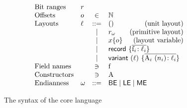 \begin{figure}
\[
\begin{array}{llclr}
  \text{Bit ranges} & r\\
  \text{Offsets}    & o & \in & \mathbb{N} \\
  \text{Layouts} & \ell & ::=  & () & \text{(unit layout)}\\ 
                 &      & \mid & r_\omega & \text{(primitive layout)} \\
                 &      & \mid & x\{o\} & \text{(layout variable)} \\
                 &      & \mid & \multicolumn{2}{l}{\mathsf{record}\ \{ \overline{\mathrm{f}_i\!: \ell_i} \}}\\
                 &      & \mid & \multicolumn{2}{l}{\mathsf{variant}\ (\ell)\ \{ \overline{\mathrm{A}_i\ (n_i)\!: \ell_i} \}}\\
  \text{Field names} & & \ni & \mathrm{f}\\
  \text{Constructors} & & \ni & \mathrm{A}\\
  \text{Endianness} & \omega & ::= & \multicolumn{2}{l}{\mathsf{BE} \mid \mathsf{LE} \mid \mathsf{ME}} \\
\end{array}
\]
\caption{The syntax of the \Dargent core language}
\label{fig:dargent-core}
\end{figure}

